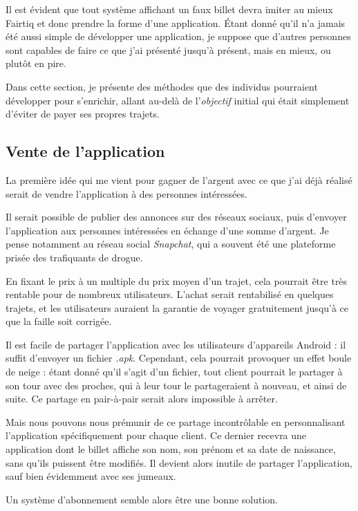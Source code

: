 \documentclass[a4paper]{article}
\begin{document}
Il est évident que tout système affichant un faux billet devra imiter au mieux Fairtiq
et donc prendre la forme d'une application. Étant donné qu'il n'a jamais été aussi simple
de développer une application, je suppose que d'autres personnes sont capables de faire ce
que j'ai présenté jusqu'à présent, mais en mieux, ou plutôt en pire.

Dans cette section, je présente des méthodes que des individus pourraient développer pour
s'enrichir, allant au-delà de l'\textit{objectif} initial qui était simplement d'éviter de payer ses
propres trajets.

\subsection{Vente de l'application}
La première idée qui me vient pour gagner de l'argent avec ce que j'ai déjà réalisé
serait de vendre l'application à des personnes intéressées.

Il serait possible de publier des annonces sur des réseaux sociaux, puis d'envoyer
l'application aux personnes intéressées en échange d'une somme d'argent. Je pense
notamment au réseau social \textit{Snapchat}, qui a souvent été une plateforme
prisée des trafiquants de drogue.

En fixant le prix à un multiple du prix moyen d'un trajet, cela pourrait être très
rentable pour de nombreux utilisateurs. L'achat serait rentabilisé en quelques trajets,
et les utilisateurs auraient la garantie de voyager gratuitement jusqu'à ce que la
faille soit corrigée.

Il est facile de partager l'application avec les utilisateurs d'appareils Android :
il suffit d'envoyer un fichier \textit{.apk}. Cependant, cela pourrait provoquer un
effet boule de neige : étant donné qu'il s'agit d'un fichier, tout client pourrait
le partager à son tour avec des proches, qui à leur tour le partageraient à nouveau,
et ainsi de suite. Ce partage en pair-à-pair serait alors impossible à arrêter.

Mais nous pouvons nous prémunir de ce partage incontrôlable en personnalisant l'application
spécifiquement pour chaque client. Ce dernier recevra une application dont le billet affiche
son nom, son prénom et sa date de naissance, sans qu'ils puissent être modifiés. Il devient
alors inutile de partager l'application, sauf bien évidemment avec ses jumeaux.


Un système d'abonnement semble alors être une bonne solution.
\end{document}
